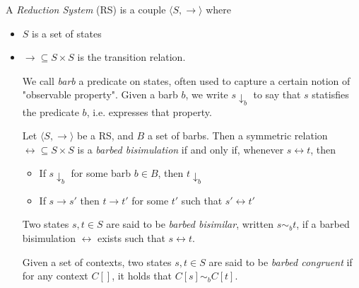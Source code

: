 A \textit{Reduction System} (RS) is a couple $\langle S,  \rightarrow \rangle$ where \begin{itemize}
\item $S$ is a set of states
\item $\rightarrow 	\subseteq S\times S$ is the transition relation.

We call \textit{barb} a predicate on states, often used to capture a certain notion of "observable property".
Given a barb $b$, we write $s\downarrow_b$ to say that $s$ statisfies the predicate $b$, i.e. expresses that property.

Let $\langle S , \rightarrow \rangle$ be a RS, and $B$ a set of barbs. Then a symmetric relation $\rel \subseteq S \times S$ is a \textit{barbed bisimulation} if and only if, whenever $s \rel t$, then 
\begin{itemize}
\item If $s \downarrow_b$ for some barb $b \in B$, then $t \downarrow_b$ \\
\item If $s \rightarrow s'$ then $t \rightarrow t'$ for some $t'$ such that $s' \rel t'$
\end{itemize}
Two states $s, t \in S$ are said to be \textit{barbed bisimilar}, written $s \sim_b t$, if a barbed bisimulation $\rel$ exists such that $s \rel t$.

Given a set of contexts, two states $s, t \in S$ are said to be \textit{barbed congruent} if for any context $C[]$, it holds that $C[s] \sim_b C[t]$. 

\end{itemize} 